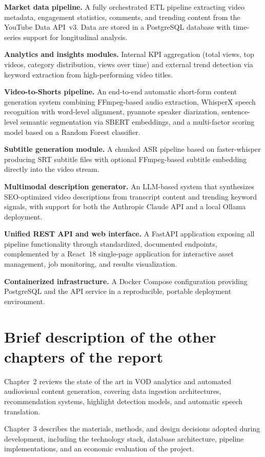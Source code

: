 \documentclass[ENG]{TFUOC}
\begin{document}
\textbf{Market data pipeline.} A fully orchestrated ETL pipeline extracting video metadata, engagement statistics, comments, and trending content from the YouTube Data API~v3. Data are stored in a PostgreSQL database with time-series support for longitudinal analysis.

\textbf{Analytics and insights modules.} Internal KPI aggregation (total views, top videos, category distribution, views over time) and external trend detection via keyword extraction from high-performing video titles.

\textbf{Video-to-Shorts pipeline.} An end-to-end automatic short-form content generation system combining FFmpeg-based audio extraction, WhisperX speech recognition with word-level alignment, pyannote speaker diarization, sentence-level semantic segmentation via SBERT embeddings, and a multi-factor scoring model based on a Random Forest classifier.

\textbf{Subtitle generation module.} A chunked ASR pipeline based on faster-whisper producing SRT subtitle files with optional FFmpeg-based subtitle embedding directly into the video stream.

\textbf{Multimodal description generator.} An LLM-based system that synthesizes SEO-optimized video descriptions from transcript content and trending keyword signals, with support for both the Anthropic Claude API and a local Ollama deployment.

\textbf{Unified REST API and web interface.} A FastAPI application exposing all pipeline functionality through standardized, documented endpoints, complemented by a React~18 single-page application for interactive asset management, job monitoring, and results visualization.

\textbf{Containerized infrastructure.} A Docker Compose configuration providing PostgreSQL and the API service in a reproducible, portable deployment environment.

\section{Brief description of the other chapters of the report}

Chapter~2 reviews the state of the art in VOD analytics and automated audiovisual content generation, covering data ingestion architectures, recommendation systems, highlight detection models, and automatic speech translation.

Chapter~3 describes the materials, methods, and design decisions adopted during development, including the technology stack, database architecture, pipeline implementations, and an economic evaluation of the project.
\end{document}
